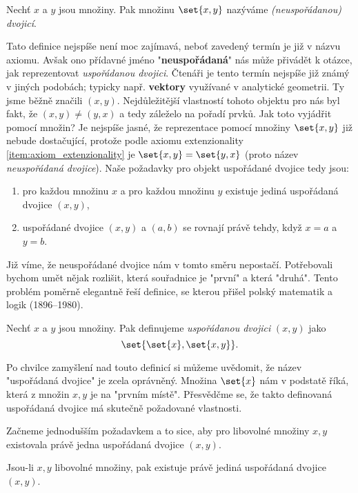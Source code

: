 \begin{definition}
    Nechť $x$ a $y$ jsou množiny. Pak množinu $\set{x,y}$ nazýváme \emph{(neuspořádanou) dvojicí}.
\end{definition}
Tato definice nejspíše není moc zajímavá, neboť zavedený termín je již v názvu axiomu. Avšak ono přídavné jméno "\textbf{neuspořádaná}" nás může přivádět k otázce, jak reprezentovat \emph{uspořádanou dvojici}. Čtenáři je tento termín nejspíše již známý v jiných podobách; typicky např. \textbf{vektory} využívané v analytické geometrii. Ty jsme běžně značili $(x,y)$. Nejdůležitější vlastností tohoto objektu pro nás byl fakt, že $(x,y)\neq (y,x)$ a tedy záleželo na pořadí prvků. Jak toto vyjádřit pomocí množin? Je nejspíše jasné, že reprezentace pomocí množiny $\set{x,y}$ již nebude dostačující, protože podle axiomu extenzionality \ref{item:axiom_extenzionality} je $\set{x,y}=\set{y,x}$ (proto název \emph{neuspořádaná dvojice}). Naše požadavky pro objekt uspořádané dvojice tedy jsou:
\begin{enumerate}
    \item pro každou množinu $x$ a pro každou množinu $y$ existuje jediná uspořádaná dvojice $(x,y)$,
    \item uspořádané dvojice $(x,y)$ a $(a,b)$ se rovnají právě tehdy, když $x=a$ a $y=b$.
\end{enumerate}
Již víme, že neuspořádané dvojice nám v tomto směru nepostačí. Potřebovali bychom umět nějak rozlišit, která souřadnice je "první" a která "druhá". Tento problém poměrně elegantně řeší definice, se kterou přišel polský matematik a logik  (1896--1980).
\begin{definition}\label{def:usporadana_dvojice}
    Nechť $x$ a $y$ jsou množiny. Pak definujeme \emph{uspořádanou dvojici} $(x,y)$ jako
    \begin{equation*}
        \set{\set{x},\set{x,y}}.
    \end{equation*}
\end{definition}
Po chvilce zamyšlení nad touto definicí si můžeme uvědomit, že název "uspořádaná dvojice" je zcela oprávněný. Množina $\set{x}$ nám v podstatě  říká, která z množin $x,y$ je na "prvním místě". Přesvědčme se, že takto definovaná uspořádaná dvojice má skutečně požadované vlastnosti.\par
Začneme jednodušším požadavkem a to sice, aby pro libovolné množiny $x,y$ existovala právě jedna uspořádaná dvojice $(x,y)$.
\begin{lemma}
    Jsou-li $x,y$ libovolné množiny, pak existuje právě jediná uspořádaná dvojice $(x,y)$.
\end{lemma}
